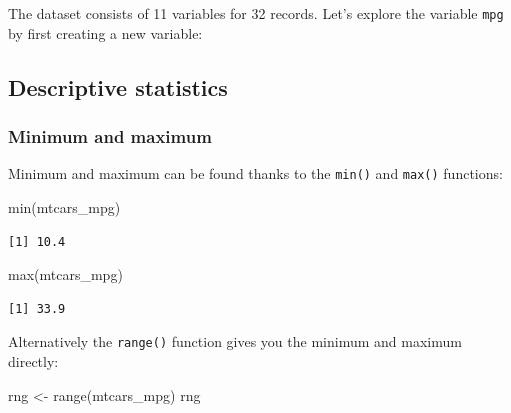 \documentclass[
  letterpaper,
  DIV=11,
  numbers=noendperiod]{scrartcl}
\newenvironment{Shaded}{\begin{snugshade}}{\end{snugshade}}
\newcommand{\FunctionTok}[1]{\textcolor[rgb]{0.28,0.35,0.67}{#1}}
\newcommand{\NormalTok}[1]{\textcolor[rgb]{0.00,0.23,0.31}{#1}}
\newcommand{\OtherTok}[1]{\textcolor[rgb]{0.00,0.23,0.31}{#1}}
\newcommand{\SpecialCharTok}[1]{\textcolor[rgb]{0.37,0.37,0.37}{#1}}
\begin{document}
The dataset consists of 11 variables for 32 records. Let's explore the
variable \texttt{mpg} by first creating a new variable:

\begin{Shaded}
\end{Shaded}

\subsection{Descriptive statistics}\label{descriptive-statistics}

\subsubsection{Minimum and maximum}\label{minimum-and-maximum}

Minimum and maximum can be found thanks to the \texttt{min()} and
\texttt{max()} functions:

\begin{Shaded}
\begin{Highlighting}[]
\FunctionTok{min}\NormalTok{(mtcars\_mpg)}
\end{Highlighting}
\end{Shaded}

\begin{verbatim}
[1] 10.4
\end{verbatim}

\begin{Shaded}
\begin{Highlighting}[]
\FunctionTok{max}\NormalTok{(mtcars\_mpg)}
\end{Highlighting}
\end{Shaded}

\begin{verbatim}
[1] 33.9
\end{verbatim}

Alternatively the \texttt{range()} function gives you the minimum and
maximum directly:

\begin{Shaded}
\begin{Highlighting}[]
\NormalTok{rng }\OtherTok{\textless{}{-}} \FunctionTok{range}\NormalTok{(mtcars\_mpg)}
\NormalTok{rng}
\end{Highlighting}
\end{Shaded}
\end{document}
